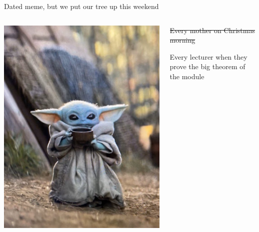 \documentclass{beamer}
\begin{document}
\begin{frame}{Dated meme, but we put our tree up this weekend}
\begin{columns}
\begin{column}{0.5\textwidth}
    \includegraphics[width=\textwidth,height=0.8\textheight,keepaspectratio]{YodaTea.jpeg}
\end{column}



\begin{column}{0.5\textwidth}
\sout{Every mother on Christmas morning}

Every lecturer when they prove the big theorem of the module

\end{column}
\end{columns}
\end{frame}
\end{document}
